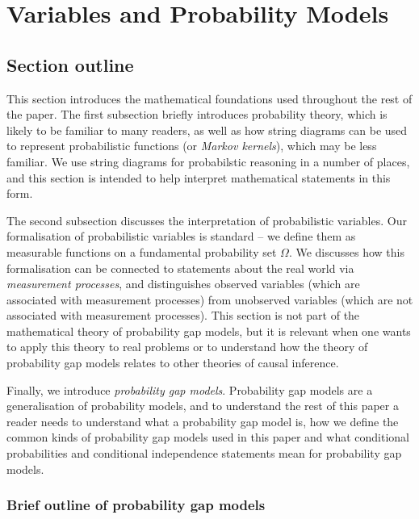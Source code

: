 

\section{Variables and Probability Models}\label{sec:vague_variables}

\subsection{Section outline}

This section introduces the mathematical foundations used throughout the rest of the paper. The first subsection briefly introduces probability theory, which is likely to be familiar to many readers, as well as how string diagrams can be used to represent probabilistic functions (or \emph{Markov kernels}), which may be less familiar. We use string diagrams for probabilstic reasoning in a number of places, and this section is intended to help interpret mathematical statements in this form.

The second subsection discusses the interpretation of probabilistic variables. Our formalisation of probabilistic variables is standard -- we define them as measurable functions on a fundamental probability set $\Omega$. We discusses how this formalisation can be connected to statements about the real world via \emph{measurement processes}, and distinguishes observed variables (which are associated with measurement processes) from unobserved variables (which are not associated with measurement processes). This section is not part of the mathematical theory of probability gap models, but it is relevant when one wants to apply this theory to real problems or to understand how the theory of probability gap models relates to other theories of causal inference.

Finally, we introduce \emph{probability gap models}. Probability gap models are a generalisation of probability models, and to understand the rest of this paper a reader needs to understand what a probability gap model is, how we define the common kinds of probability gap models used in this paper and what conditional probabilities and conditional independence statements mean for probability gap models.

\subsubsection{Brief outline of probability gap models}

